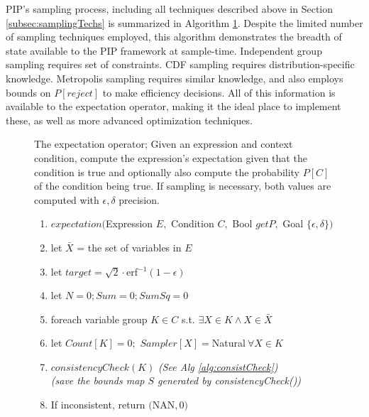 PIP's sampling process, including all techniques described above in Section \ref{subsec:samplingTechs} is summarized in Algorithm \ref{alg:roadmap}.  Despite the limited number of sampling techniques employed, this algorithm demonstrates the breadth of state available to the PIP framework at sample-time.  Independent group sampling requires set of constraints.  CDF sampling requires distribution-specific knowledge.  Metropolis sampling requires similar knowledge, and also employs bounds on $P[reject]$ to make efficiency decisions.  All of this information is available to the expectation operator, making it the ideal place to implement these, as well as more advanced optimization techniques.

\begin{figure}
\begin{algorithm} The expectation operator; Given an expression and context condition, compute  the expression's expectation given that the condition is true and optionally also compute the probability $P[C]$ of the condition being true.  If sampling is necessary, both values are computed with $\epsilon, \delta$ precision.
\label{alg:roadmap}
\footnotesize
\begin{enumerate}
\item $expectation($Expression $E,$ Condition $C,$ Bool $getP,$ Goal $\{\epsilon, \delta\})$
\item \hspace*{0.1in} let $\bar X$ = the set of variables in $E$
\item \hspace*{0.1in} let $target = \sqrt{2}\cdot $erf$^{-1}(1-\epsilon)$
\item \hspace*{0.1in} let $N = 0; Sum = 0; SumSq = 0$
\item \hspace*{0.1in} foreach variable group $K \in C$ s.t. $\exists X \in K \wedge X \in \bar X$ 
\item \hspace*{0.2in} let $Count[K] = 0;$ $Sampler[X] = $Natural$\ \forall X \in K$
\item \hspace*{0.2in} $consistencyCheck(K)$ \textit{(See Alg \ref{alg:consistCheck})}
\\    \hspace*{0.2in} \textit{(save the bounds map $S$ generated by consistencyCheck())}
\item \hspace*{0.2in} If inconsistent, return $($NAN$,0)$

\end{enumerate}
\end{algorithm}
\end{figure}
